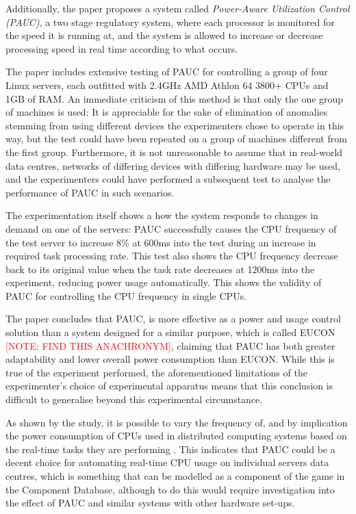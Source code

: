 Additionally, the paper proposes a system called \emph{Power-Aware Utilization Control (PAUC)}, a two stage regulatory system, where each processor is monitored for the speed it is running at, and the system is allowed to increase or decrease processing speed in real time according to what occurs.

The paper includes extensive testing of PAUC for controlling a group of four Linux servers, each outfitted with 2.4GHz AMD Athlon 64 3800+ CPUs and 1GB of RAM.
An immediate criticism of this method is that only the one group of machines is used: It is appreciable for the sake of elimination of anomalies stemming from using different devices the experimenters chose to operate in this way, but the test could have been repeated on a group of machines different from the first group. Furthermore, it is not unreasonable to assume that in real-world data centres, networks of differing devices with differing hardware may be used, and the experimenters could have performed a subsequent test to analyse the performance of PAUC in such scenarios.

The experimentation itself shows a how the system responds to changes in demand on one of the servers: PAUC successfully causes the CPU frequency of the test server to increase 8\% at 600ms into the test during an increase in required task processing rate. This test also shows the CPU frequency decrease back to its original value when the task rate decreases at 1200ms into the experiment, reducing power usage automatically. This shows the validity of PAUC for controlling the CPU frequency in single CPUs.

The paper concludes that PAUC, is more effective as a power and usage control solution than a system designed for a similar purpose, which is called EUCON \textcolor{red}{[NOTE: FIND THIS ANACHRONYM]}, claiming that PAUC has both greater adaptability and lower overall power consumption than EUCON. While this is true of the experiment performed, the aforementioned limitations of the experimenter's choice of experimental apparatus means that this conclusion is difficult to generalise beyond this experimental circumstance.

As shown by the study, it is possible to vary the frequency of, and by implication the power consumption of CPUs used in distributed computing systems based on the real-time tasks they are performing \cite{PAUCPower-AwareUtilizationControlInDistributedRealTimeSystems}. This indicates that PAUC could be a decent choice for automating real-time CPU usage on individual servers data centres, which is something that can be modelled as a component of the game in the Component Database, although to do this would require investigation into the effect of PAUC and similar systems with other hardware set-ups.

